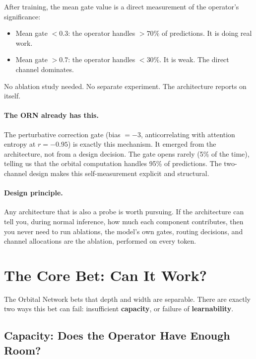 \documentclass[11pt, a4paper]{article}
\theoremstyle{plain}
\theoremstyle{definition}
\theoremstyle{remark}
\begin{document}
After training, the mean gate value is a direct measurement of the operator's significance:
\begin{itemize}[nosep]
\item Mean gate $< 0.3$: the operator handles $> 70\%$ of predictions. It is doing real work.
\item Mean gate $> 0.7$: the operator handles $< 30\%$. It is weak. The direct channel dominates.
\end{itemize}

No ablation study needed.
No separate experiment.
The architecture reports on itself.

\paragraph{The ORN already has this.}
The perturbative correction gate (bias $= -3$, anticorrelating with attention entropy at $r = -0.95$) is exactly this mechanism.
It emerged from the architecture, not from a design decision.
The gate opens rarely (5\% of the time), telling us that the orbital computation handles 95\% of predictions.
The two-channel design makes this self-measurement explicit and structural.

\paragraph{Design principle.}
Any architecture that is also a probe is worth pursuing.
If the architecture can tell you, during normal inference, how much each component contributes, then you never need to run ablations, the model's own gates, routing decisions, and channel allocations are the ablation, performed on every token.


\section{The Core Bet: Can It Work?}
\label{sec:core-bet}

The Orbital Network bets that depth and width are separable.
There are exactly two ways this bet can fail: insufficient \textbf{capacity}, or failure of \textbf{learnability}.

\subsection{Capacity: Does the Operator Have Enough Room?}
\end{document}
